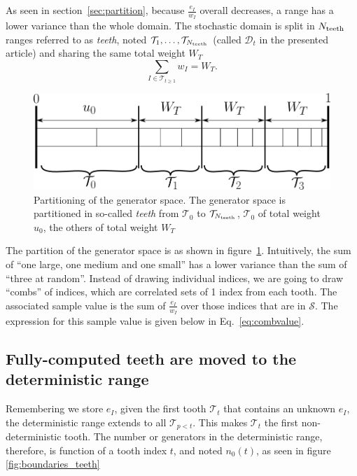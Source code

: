 \documentclass[./thesis.tex]{subfiles}
\begin{document}
As seen in section~\ref{sec:partition}, because $\frac{e_I}{w_I}$ overall decreases, a range has a lower variance than the whole domain. The stochastic domain is split in $N_\text{teeth}$ ranges referred to as \emph{teeth}, noted $\mathcal{T}_1,\ldots,\mathcal{T}_{N_\text{teeth}}$ (called $\mathcal{D}_t$ in the presented article) and sharing the same total weight $W_T$
\begin{equation}
\sum_{I \in \mathcal{T}_{t \geq 1}} w_I=W_T.
\end{equation}

 \begin{figure}[h!]
	\begin{center}
	\includegraphics[width=0.6\columnwidth]{figures/pt2/teeth}
	\end{center}
	\caption{Partitioning of the generator space.
		The generator space is partitioned in so-called \emph{teeth} from $\mathcal{T}_0$ to $\mathcal{T}_{N_\text{teeth}}$, $\mathcal{T}_0$ of total weight $u_0$, the others of total weight $W_T$}
	\label{fig:teeth}
\end{figure}

The partition of the generator space is as shown in figure~\ref{fig:teeth}.
Intuitively, the sum of ``one large, one medium and one small'' has a lower variance than the sum of ``three at random''. Instead of drawing individual indices, we are going to draw ``combs'' of indices, which are correlated sets of 1 index from each tooth. The associated sample value is the sum of $\frac{e_I}{w_I}$ over those indices that are in $\mathcal{S}$.  The expression for this sample value is given below in Eq.~\eqref{eq:combvalue}.

\subsection{Fully-computed teeth are moved to the deterministic range}

Remembering we store $e_I$, given the first tooth $\mathcal{T}_t$ that contains an unknown $e_I$, the deterministic range extends to all $\mathcal{T}_{p<t}$. This makes $\mathcal{T}_t$ the first non-deterministic tooth.
The number or generators in the deterministic range, therefore, is function of a tooth index $t$, and noted $n_0(t)$, as seen in figure \ref{fig:boundaries_teeth}
\end{document}

